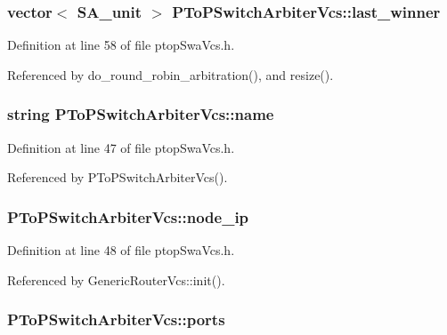 \subsubsection[{last\_\-winner}]{\setlength{\rightskip}{0pt plus 5cm}vector$<$ {\bf SA\_\-unit} $>$ {\bf PToPSwitchArbiterVcs::last\_\-winner}\hspace{0.3cm}{\tt  [private]}}\label{classPToPSwitchArbiterVcs_a6b5938bab8fdff0a73c1e16efd8560f}




Definition at line 58 of file ptopSwaVcs.h.

Referenced by do\_\-round\_\-robin\_\-arbitration(), and resize().
\subsubsection[{name}]{\setlength{\rightskip}{0pt plus 5cm}string {\bf PToPSwitchArbiterVcs::name}}\label{classPToPSwitchArbiterVcs_57ac7f9cfd7322643f12c550ae9b1171}




Definition at line 47 of file ptopSwaVcs.h.

Referenced by PToPSwitchArbiterVcs().
\subsubsection[{node\_\-ip}]{ {\bf PToPSwitchArbiterVcs::node\_\-ip}}\label{classPToPSwitchArbiterVcs_0366e83fa194f5e5ef6ac5fe628e70fb}




Definition at line 48 of file ptopSwaVcs.h.

Referenced by GenericRouterVcs::init().
\subsubsection[{ports}]{ {\bf PToPSwitchArbiterVcs::ports}\hspace{0.3cm}{\tt  [private]}}\label{classPToPSwitchArbiterVcs_7b971bdd0d68a0e81e192312f51a5c4a}




